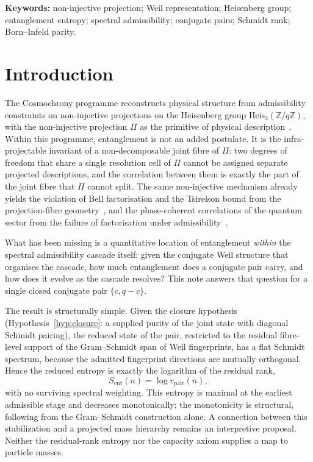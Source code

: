 \documentclass[11pt]{article}
\newcommand{\Heis}{\mathrm{Heis}}
\newcommand{\Sent}{S_{\mathrm{ent}}}
\newcommand{\rpair}{r_{\mathrm{pair}}}
\begin{document}
  \noindent\textbf{Keywords:}
  non-injective projection;
  Weil representation;
  Heisenberg group;
  entanglement entropy;
  spectral admissibility;
  conjugate pairs;
  Schmidt rank;
  Born--Infeld parity.

  \newpage
  \tableofcontents

  \newpage
  \section{Introduction}
    \label{sec:intro}

    The Cosmochrony programme reconstructs physical structure from admissibility constraints on non-injective
    projections on the Heisenberg group $\Heis_3(\mathbb{Z}/q\mathbb{Z})$, with the non-injective projection
    $\Pi$ as the primitive of physical description~\cite{Cosmochrony,Beau2026m,Beau2026l}.
    Within this programme, entanglement is not an added postulate.
    It is the infra-projectable invariant of a non-decomposable joint fibre of $\Pi$: two degrees of freedom
    that share a single resolution cell of $\Pi$ cannot be assigned separate projected descriptions, and the
    correlation between them is exactly the part of the joint fibre that $\Pi$ cannot split.
    The same non-injective mechanism already yields the violation of Bell factorisation and the Tsirelson
    bound from the projection-fibre geometry~\cite{Beau2026b}, and the phase-coherent correlations of the
    quantum sector from the failure of factorisation under admissibility~\cite{Beau2026q1,Beau2026HeisenbergStructure}.

    What has been missing is a quantitative location of entanglement \emph{within} the spectral admissibility
    cascade itself: given the conjugate Weil structure that organises the cascade, how much entanglement does a
    conjugate pair carry, and how does it evolve as the cascade resolves?
    This note answers that question for a single closed conjugate pair $\{c,q-c\}$.

    The result is structurally simple.
    Given the closure hypothesis (Hypothesis~\ref{hyp:closure}: a supplied purity of the joint state with
    diagonal Schmidt pairing), the reduced state of the pair, restricted to the residual fibre-level support of
    the Gram--Schmidt span of
    Weil fingerprints, has a flat Schmidt spectrum, because the admitted fingerprint directions are mutually
    orthogonal.
    Hence the reduced entropy is exactly the logarithm of the residual rank,
    \[
      \Sent(n)=\log \rpair(n),
    \]
    with no surviving spectral weighting.
    This entropy is maximal at the earliest admissible stage and decreases monotonically; the monotonicity is
    structural, following from the Gram--Schmidt construction alone.
    A connection between this stabilization and a projected mass hierarchy remains an interpretive proposal.
    Neither the residual-rank entropy nor the capacity axiom supplies a map to particle masses.
\end{document}
